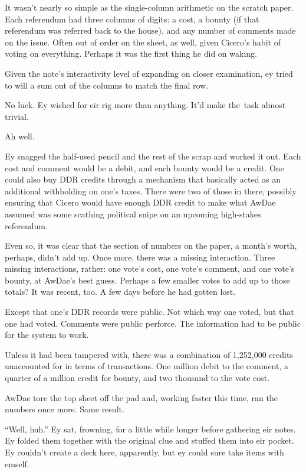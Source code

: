 It wasn't nearly so simple as the single-column arithmetic on the scratch paper. Each referendum had three columns of digits: a cost, a bounty (if that referendum was referred back to the house), and any number of comments made on the issue. Often out of order on the sheet, as well, given Cicero's habit of voting on everything. Perhaps it was the first thing he did on waking.

Given the note's interactivity level of expanding on closer examination, ey tried to will a sum out of the columns to match the final row.

No luck. Ey wished for eir rig more than anything. It'd make the\pagebreak\ task almost trivial.

Ah well.

Ey snagged the half-used pencil and the rest of the scrap and worked it out. Each cost and comment would be a debit, and each bounty would be a credit. One could also buy DDR credits through a mechanism that basically acted as an additional withholding on one's taxes. There were two of those in there, possibly ensuring that Cicero would have enough DDR credit to make what AwDae assumed was some scathing political snipe on an upcoming high-stakes referendum.

Even so, it was clear that the section of numbers on the paper, a month's worth, perhaps, didn't add up. Once more, there was a missing interaction. Three missing interactions, rather: one vote's cost, one vote's comment, and one vote's bounty, at AwDae's best guess. Perhaps a few smaller votes to add up to those totals? It was recent, too. A few days before he had gotten lost.

Except that one's DDR records were public. Not which way one voted, but that one had voted. Comments were public perforce. The information had to be public for the system to work.

Unless it had been tampered with, there was a combination of 1,252,000 credits unaccounted for in terms of transactions. One million debit to the comment, a quarter of a million credit for bounty, and two thousand to the vote cost.

AwDae tore the top sheet off the pad and, working faster this time, ran the numbers once more. Same result.

``Well, huh.'' Ey sat, frowning, for a little while longer before gathering eir notes. Ey folded them together with the original clue and stuffed them into eir pocket. Ey couldn't create a deck here, apparently, but ey could sure take items with emself.

